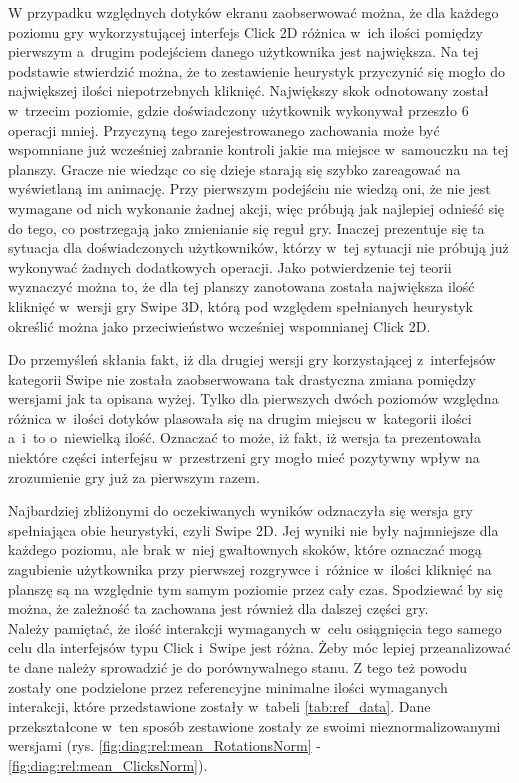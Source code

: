 \documentclass[a4paper,12pt,numbers=noenddot]{report}
\begin{document}
W przypadku względnych dotyków ekranu zaobserwować można, że dla każdego poziomu gry wykorzystującej interfejs Click 2D różnica w~ich ilości pomiędzy pierwszym a~drugim podejściem danego użytkownika jest największa. Na tej podstawie stwierdzić można, że to zestawienie heurystyk przyczynić się mogło do największej ilości niepotrzebnych kliknięć. Największy skok odnotowany został w~trzecim poziomie, gdzie doświadczony użytkownik wykonywał przeszło 6 operacji mniej. Przyczyną tego zarejestrowanego zachowania może być wspomniane już wcześniej zabranie kontroli jakie ma miejsce w~samouczku na tej planszy. Gracze nie wiedząc co się dzieje starają się szybko zareagować na wyświetlaną im animację. Przy pierwszym podejściu nie wiedzą oni, że nie jest wymagane od nich wykonanie żadnej akcji, więc próbują jak najlepiej odnieść się do tego, co postrzegają jako zmienianie się reguł gry.
Inaczej prezentuje się ta sytuacja dla doświadczonych użytkowników, którzy w~tej sytuacji nie próbują już wykonywać żadnych dodatkowych operacji. Jako potwierdzenie tej teorii wyznaczyć można to, że dla tej planszy zanotowana została największa ilość kliknięć w~wersji gry Swipe 3D, którą pod względem spełnianych heurystyk określić można jako przeciwieństwo wcześniej wspomnianej Click 2D.

Do przemyśleń skłania fakt, iż dla drugiej wersji gry korzystającej z~interfejsów kategorii Swipe nie została zaobserwowana tak drastyczna zmiana pomiędzy wersjami jak ta opisana wyżej. Tylko dla pierwszych dwóch poziomów względna różnica w~ilości dotyków plasowała się na drugim miejscu w~kategorii ilości a~i~to o~niewielką ilość. Oznaczać to może, iż fakt, iż wersja ta prezentowała niektóre części interfejsu w~przestrzeni gry mogło mieć pozytywny wpływ na zrozumienie gry już za pierwszym razem.

Najbardziej zbliżonymi do oczekiwanych wyników odznaczyła się wersja gry spełniająca obie heurystyki, czyli Swipe 2D. Jej wyniki nie były najmniejsze dla każdego poziomu, ale brak w~niej gwałtownych skoków, które oznaczać mogą zagubienie użytkownika przy pierwszej rozgrywce i~różnice w~ilości kliknięć na planszę są na względnie tym samym poziomie przez cały czas. Spodziewać by się można, że zależność ta zachowana jest również dla dalszej części gry.\\

Należy pamiętać, że ilość interakcji wymaganych w~celu osiągnięcia tego samego celu dla interfejsów typu Click i~Swipe jest różna. Żeby móc lepiej przeanalizować te dane należy sprowadzić je do porównywalnego stanu. Z tego też powodu zostały one podzielone przez referencyjne minimalne ilości wymaganych interakcji, które przedstawione zostały w~tabeli \ref{tab:ref_data}. Dane przekształcone w~ten sposób zestawione zostały ze swoimi nieznormalizowanymi wersjami (rys. \ref{fig:diag:rel:mean_RotationsNorm} - \ref{fig:diag:rel:mean_ClicksNorm}).
\end{document}
